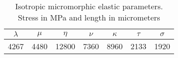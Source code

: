 \documentclass[10pt,a4paper]{article}
\begin{document}
\begin{table}[!htbp]
\centering \caption{\small Isotropic micromorphic elastic parameters.  Stress in MPa and length in micrometers}
{\small
\begin{tabular}{|c|c|c|c|c|c|c|} \hline
$\lambda$   &  $\mu$  &$\eta$ & $\nu$  &$\kappa$ &$\tau$ &$\sigma$  \\ \hline
 4267      &   4480  &  12800 & 7360   &   8960  &  2133 & 1920      \\ \hline
\end{tabular}
}
\label{tab:params}
\end{table}
\end{document}
